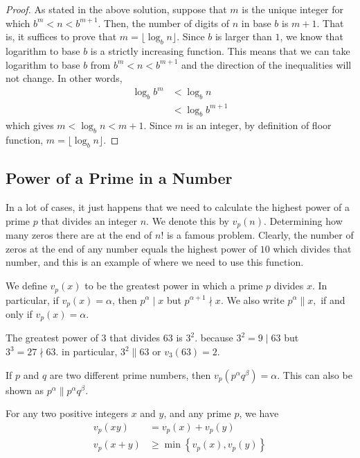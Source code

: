 \documentclass{subfile}
\begin{document}
	\begin{proof}
		As stated in the above solution, suppose that $m$ is the unique integer for which $b^m < n <b^{m+1}$. Then, the number of digits of $n$ in base $b$ is $m+1$. That is, it suffices to prove that $m=\lfloor \log_b n\rfloor$. Since $b$ is larger than $1$, we know that logarithm to base $b$ is a strictly increasing function. This means that we can take logarithm to base $b$ from $b^m < n <b^{m+1}$ and the direction of the inequalities will not change. In other words,
			\begin{align*}
				\log_b b^m
					& < \log_b n\\
					& < \log_b b^{m+1}
			\end{align*}
		which gives $m<\log_b n<m+1$. Since $m$ is an integer, by definition of floor function, $m=\lfloor \log_b n \rfloor$.
	\end{proof}
\subsection{Power of a Prime in a Number} \label{sec:powerofprimes}
In a lot of cases, it just happens that we need to calculate the highest power of a prime $p$ that divides an integer $n$. We denote this by $v_p(n)$. Determining how many zeros there are at the end of $n!$ is a famous problem. Clearly, the number of zeros at the end of any number equals the highest power of $10$ which divides that number, and this is an example of where we need to use this function.

\begin{definition}\label{def:vp}
	We define $v_p(x)$ to be the greatest power in which a prime $p$ divides $x$. In particular, if $v_p(x)=\alpha$, then $p^{\alpha} \mid x$ but $p^{\alpha+1} \nmid x$. We also write $p^{\alpha} \|  x, $ if and only if $v_p(x) = \alpha$.
\end{definition}

\begin{example}
	The greatest power of $3$ that divides $63$ is $3^2.$ because $3^2=9 \mid 63$ but $3^3 =27 \nmid 63.$
	in particular, $ 3^2 \|  63$ or $v_3(63)=2.$
\end{example}

\begin{example}
	If $p$ and $q$ are two different prime numbers, then $ v_p( p^ \alpha q^ \beta) = \alpha$. This can also be shown as $p^\alpha \|  p^ \alpha q^ \beta$.
\end{example}

\begin{proposition} \label{prop:v_p-rule}
	For any two positive integers $x$ and $y$, and any prime $p$, we have
	\begin{align*}
		v_p(xy)
		& =v_p(x)+v_p(y)\\
		v_p(x+y)
		& \geq\min\left\{v_p(x),v_p(y)\right\}
	\end{align*}
\end{proposition}
\end{document}
